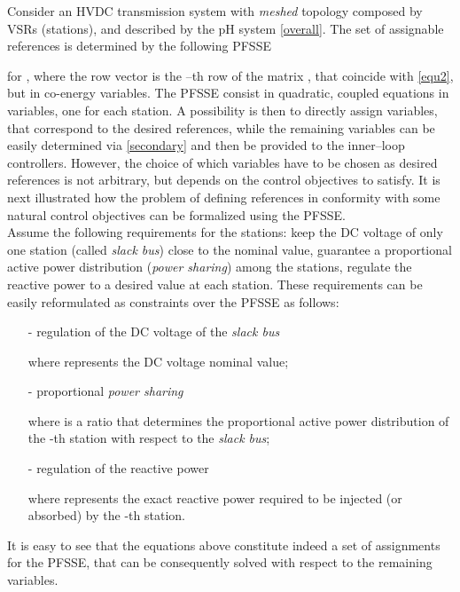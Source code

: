 \documentclass[5p,twocolumn]{elsarticle}
\numberwithin{equation}{section}
\begin{document}
Consider an HVDC transmission system with \textit{meshed} topology composed by  VSRs (stations), and described by the pH system \eqref{overall}.  The set of assignable references is determined by the following PFSSE

for , where the row vector  is the --th row of the matrix , that coincide with \eqref{equ2}, but in co-energy variables. The PFSSE consist in  quadratic, coupled equations in  variables, one for each station. A possibility is then to directly assign  variables, that correspond to the desired references, while the remaining  variables can be easily determined via \eqref{secondary} and then be provided to the inner--loop controllers. However, the choice of which variables have to be chosen as desired references is not arbitrary, but depends on the control objectives to satisfy. It is next illustrated how the problem of defining references in conformity with some natural control objectives can be formalized using the PFSSE. \\
Assume the following requirements for the  stations:  keep the DC voltage of only one station (called \textit{slack bus}) close to the nominal value, guarantee a proportional active power distribution (\textit{power sharing}) among the stations, regulate the reactive power to a desired value at each station. These requirements can be easily reformulated as constraints over the PFSSE as follows:

\begin{itemize}
\item[-] regulation of the DC voltage of the \textit{slack bus}

where  represents the DC voltage nominal value;
\item[-] proportional \textit{power sharing}

where  is a ratio that determines the proportional active power distribution of the -th station with respect to the \textit{slack bus};
\item[-] regulation of the reactive power

where  represents the exact reactive power required to be injected (or absorbed) by the -th station.
\end{itemize}

It is easy to see that the equations above constitute indeed a set of  assignments for the PFSSE, that can be consequently solved with respect to the remaining variables.
\end{document}
